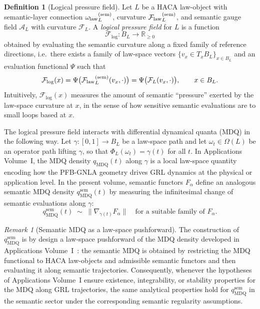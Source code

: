 \documentclass[11pt]{book}
\theoremstyle{plain}
\theoremstyle{definition}
\newtheorem{definition}[theorem]{Definition}
\theoremstyle{remark}
\newtheorem{remark}[theorem]{Remark}
\begin{document}
\begin{definition}[Logical pressure field]
\label{def:logical-pressure-field}
Let $L$ be a HACA law-object with semantic-layer connection
${\omega_{\mathrm{law}}}_L^{(\mathrm{sem})}$, curvature ${\mathcal{F}_{\mathrm{law}}}_L^{(\mathrm{sem})}$,
and semantic gauge field $\mathcal{A}_L$ with curvature $\mathcal{F}_L$.
A \emph{logical pressure field} for $L$ is a function
\[
  \mathcal{F}_{\mathrm{log}} : B_L \longrightarrow \mathbb{R}_{\ge 0}
\]
obtained by evaluating the semantic curvature along a fixed family of
reference directions, i.e.\ there exists a family of law-space vectors
$\{v_x\in T_x B_L\}_{x\in B_L}$ and an evaluation functional
$\Psi$ such that
\[
  \mathcal{F}_{\mathrm{log}}(x)
  =
  \Psi\bigl({\mathcal{F}_{\mathrm{law}}}_L^{(\mathrm{sem})}(v_x,\cdot)\bigr)
  =
  \Psi\bigl(\mathcal{F}_L(v_x,\cdot)\bigr),
  \qquad x\in B_L.
\]
Intuitively, $\mathcal{F}_{\mathrm{log}}(x)$ measures the amount of
semantic ``pressure'' exerted by the law-space curvature at $x$, in the
sense of how sensitive semantic evaluations are to small loops based at
$x$.
\end{definition}

The logical pressure field interacts with differential dynamical quanta
(MDQ) in the following way. Let $\gamma:[0,1]\to B_L$ be a law-space
path and let $\omega_t\in\Omega(L)$ be an operator path lifting
$\gamma$, so that $\Phi_L(\omega_t)=\gamma(t)$ for all $t$. In
Applications Volume~I, the MDQ density $q_{\mathrm{MDQ}}(t)$ along
$\gamma$ is a local law-space quantity encoding how the PFB-GNLA
geometry drives GRL dynamics at the physical or application level. In
the present volume, semantic functors $F_\alpha$ define an analogous
semantic MDQ density $q_{\mathrm{MDQ}}^{\mathrm{sem}}(t)$ by measuring
the infinitesimal change of semantic evaluations along $\gamma$:
\[
  q_{\mathrm{MDQ}}^{\mathrm{sem}}(t)
  \;\sim\;
  \bigl\|
    \nabla_{\dot{\gamma}(t)} F_\alpha
  \bigr\|
  \quad\text{for a suitable family of }F_\alpha.
\]

\begin{remark}[Semantic MDQ as a law-space pushforward]
\label{rem:semantic-mdq-pushforward}
The construction of \(q_{\mathrm{MDQ}}^{\mathrm{sem}}\) is by design a
law-space pushforward of the MDQ density developed in Applications
Volume~I~\cite{GaoZhengAppVol1}: the semantic MDQ is obtained by
restricting the MDQ functional to HACA law-objects and admissible
semantic functors and then evaluating it along semantic trajectories.
Consequently, whenever the hypotheses of Applications Volume~I ensure
existence, integrability, or stability properties for the MDQ along GRL
trajectories, the same analytical properties hold for
\(q_{\mathrm{MDQ}}^{\mathrm{sem}}\) in the semantic sector under the
corresponding semantic regularity assumptions.
\end{remark}
\end{document}
